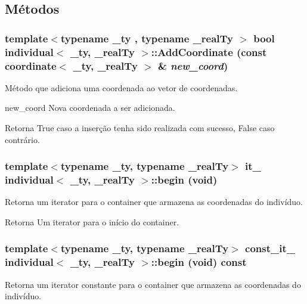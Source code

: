 \subsection{Métodos}
\hypertarget{classindividual_a06553b7f9e7ae18920b6956d68aec8f9}{
\subsubsection[{AddCoordinate}]{\setlength{\rightskip}{0pt plus 5cm}template$<$typename \_\-ty , typename \_\-realTy $>$ bool {\bf individual}$<$ \_\-ty, \_\-realTy $>$::AddCoordinate (const {\bf coordinate}$<$ \_\-ty, \_\-realTy $>$ \& {\em new\_\-coord})}}
\label{classindividual_a06553b7f9e7ae18920b6956d68aec8f9}
Método que adiciona uma coordenada ao vetor de coordenadas.

new\_\-coord Nova coordenada a ser adicionada.

\begin{DoxyReturn}{Retorna}
True caso a inserção tenha sido realizada com sucesso, False caso contrário. 
\end{DoxyReturn}
\hypertarget{classindividual_a593da2dd173a84dd3dec95fd505cc348}{
\subsubsection[{begin}]{\setlength{\rightskip}{0pt plus 5cm}template$<$typename \_\-ty, typename \_\-realTy$>$ {\bf it\_\-} {\bf individual}$<$ \_\-ty, \_\-realTy $>$::begin (void)}}
\label{classindividual_a593da2dd173a84dd3dec95fd505cc348}
Retorna um iterator para o container que armazena as coordenadas do indivíduo.

\begin{DoxyReturn}{Retorna}
Um iterator para o início do container. 
\end{DoxyReturn}
\hypertarget{classindividual_aacc10fcba3051c1b1913afe924c8f293}{
\subsubsection[{begin}]{\setlength{\rightskip}{0pt plus 5cm}template$<$typename \_\-ty, typename \_\-realTy$>$ {\bf const\_\-it\_\-} {\bf individual}$<$ \_\-ty, \_\-realTy $>$::begin (void) const}}
\label{classindividual_aacc10fcba3051c1b1913afe924c8f293}
Retorna um iterator constante para o container que armazena as coordenadas do indivíduo.

